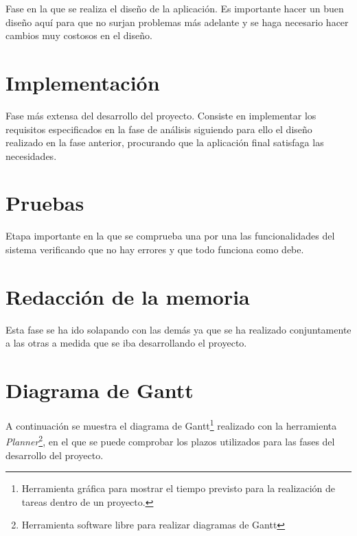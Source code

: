 Fase en la que se realiza el diseño de la aplicación. Es importante hacer un buen diseño aquí para que no surjan problemas más adelante y se haga necesario hacer cambios muy costosos en el diseño.

\section{Implementación}

Fase más extensa del desarrollo del proyecto. Consiste en implementar los requisitos especificados en la fase de análisis siguiendo para ello el diseño realizado en la fase anterior, procurando que la aplicación final satisfaga las necesidades.

\section{Pruebas}

Etapa importante en la que se comprueba una por una las funcionalidades del sistema verificando que no hay errores y que todo funciona como debe.

\section{Redacción de la memoria}
Esta fase se ha ido solapando con las demás ya que se ha realizado conjuntamente a las otras a medida que se iba desarrollando el proyecto. 

\section{Diagrama de Gantt}
A continuación se muestra el diagrama de Gantt\footnote{Herramienta gráfica para mostrar el tiempo previsto para la realización de tareas dentro de un proyecto.} realizado con la herramienta {\em Planner}\footnote{Herramienta software libre para realizar diagramas de Gantt}, en el que se puede comprobar los plazos utilizados para las fases del desarrollo del proyecto.
\newpage





